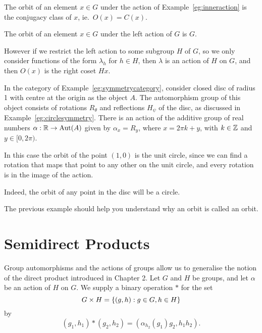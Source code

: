 \begin{example}
  The orbit of an element $x \in G$ under the action of
  Example~\ref{eg:inneraction} is the conjugacy class of $x$, ie.~$O(x) =
  C(x)$.
\end{example}

\begin{example}
  The orbit of an element $x \in G$ under the left action of $G$ is $G$.
  
  However if we restrict the left action to some subgroup $H$ of $G$, so
  we only consider functions of the form $\lambda_{h}$ for $h \in H$, then
  $\lambda$ is an action of $H$ on $G$, and then $O(x)$ is the right coset
  $Hx$.
\end{example}

\begin{example}
  In the category of Example~\ref{eg:symmetrycategory}, consider closed disc
  of radius 1 with centre at the origin as the object $A$.  The
  automorphism group of this object consists of
  rotations $R_{\theta}$ and reflections $H_{\psi}$ of the disc, as discussed
  in Example~\ref{eg:circlesymmetry}.  There is an action of the additive
  group of real numbers $\alpha: \mathbb{R} \to \operatorname{Aut}(A)$ given by $\alpha_{x} = R_{y}$,
  where $x = 2\pi k + y$, with $k \in \mathbb{Z}$ and $y \in [0,2\pi)$.
  
  In this case the orbit of the point $(1,0)$ is the unit circle, since we
  can find a rotation that maps that point to any other on the unit circle,
  and every rotation is in the image of the action.
  
  Indeed, the orbit of any point in the disc will be a circle.
\end{example}

The previous example should help you understand why an orbit is called an
orbit.

\section{Semidirect Products}

Group automorphisms and the actions of groups allow us to generalise the
notion of the direct product introduced in Chapter 2.  Let $G$ and $H$ be
groups, and let $\alpha$ be an action of $H$ on $G$.  We supply a binary
operation $\ast$ for the set
\[
  G \times H = \{ (g,h) : g \in G, h \in H \}
\]
by
\[
  (g_{1}, h_{1}) \ast (g_{2}, h_{2}) = (\alpha_{h_{2}}(g_{1})g_{2}, h_{1}h_{2}).
\]

